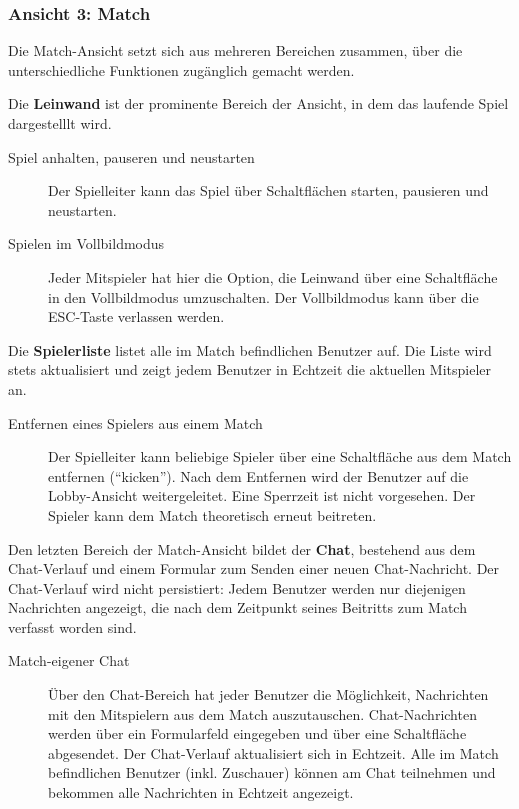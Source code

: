 \subsubsection*{Ansicht 3: Match}\label{sec:view-match}

Die Match-Ansicht setzt sich aus mehreren Bereichen zusammen, über die
unterschiedliche Funktionen zugänglich gemacht werden.

Die \textbf{Leinwand} ist der prominente Bereich der Ansicht, in dem das
laufende Spiel dargestelllt wird.

\begin{description}
    \item [Spiel anhalten, pauseren und neustarten] Der Spielleiter kann das Spiel über Schaltflächen starten, pausieren und neustarten.
    \item [Spielen im Vollbildmodus] Jeder Mitspieler hat hier die Option, die Leinwand über eine Schaltfläche in den Vollbildmodus umzuschalten. Der Vollbildmodus kann über die ESC-Taste verlassen werden.
\end{description}

Die \textbf{Spielerliste} listet alle im Match befindlichen Benutzer
auf. Die Liste wird stets aktualisiert und zeigt jedem Benutzer in
Echtzeit die aktuellen Mitspieler an.

\begin{description}
    \item [Entfernen eines Spielers aus einem Match] Der Spielleiter kann beliebige Spieler über eine Schaltfläche aus dem Match entfernen (“kicken”). Nach dem Entfernen wird der Benutzer auf die Lobby-Ansicht weitergeleitet. Eine Sperrzeit ist nicht vorgesehen. Der Spieler kann dem Match theoretisch erneut beitreten.
\end{description}

Den letzten Bereich der Match-Ansicht bildet der \textbf{Chat},
bestehend aus dem Chat-Verlauf und einem Formular zum Senden einer neuen
Chat-Nachricht. Der Chat-Verlauf wird nicht persistiert: Jedem Benutzer
werden nur diejenigen Nachrichten angezeigt, die nach dem Zeitpunkt
seines Beitritts zum Match verfasst worden sind.

\begin{description}
    \item [Match-eigener Chat] Über den Chat-Bereich hat jeder Benutzer die Möglichkeit, Nachrichten mit den Mitspielern aus dem Match auszutauschen. Chat-Nachrichten werden über ein Formularfeld eingegeben und über eine Schaltfläche abgesendet. Der Chat-Verlauf aktualisiert sich in Echtzeit. Alle im Match befindlichen Benutzer (inkl. Zuschauer) können am Chat teilnehmen und bekommen alle Nachrichten in Echtzeit angezeigt.
\end{description}

